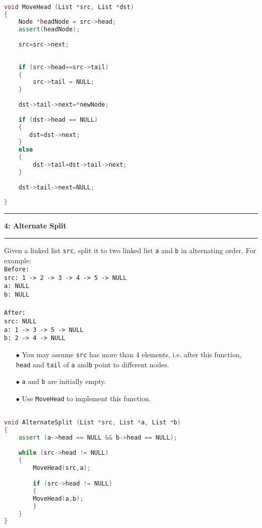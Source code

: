 \documentclass[10.5pt]{article}
\newcommand\question[2]{\vspace{.25in}\hrule\textbf{#1: #2}\vspace{.5em}\hrule\vspace{.10in}}
\begin{document}
\hrulefill
\begin{lstlisting}[language=C++]

void MoveHead (List *src, List *dst)
{
    Node *headNode = src->head;
    assert(headNode);
    
    src=src->next;
    
        
    if (src->head==src->tail)
    {
        src->tail = NULL;
    }
    
    dst->tail->next=*newNode;
    
    if (dst->head == NULL)
    {
       dst=dst->next;
    }
    else
    {
        dst->tail=dst->tail->next;
    }
    
    dst->tail->next=NULL;
    
}

\end{lstlisting}
\pagebreak

\question{4}{Alternate Split}
Given a linked list \texttt{src}, split it to two linked list  \texttt{a} and \texttt{b} in alternating order. For example:\\

\texttt{Before:}\\
\texttt{src: 1 -> 2 -> 3 -> 4 -> 5 -> NULL}\\
\texttt{a: NULL}\\
\texttt{b: NULL}\\
\\
\texttt{After:}\\
\texttt{src: NULL}\\
\texttt{a: 1 -> 3 -> 5 -> NULL}\\
\texttt{b: 2 -> 4 -> NULL}\\

\begin{enumerate}
	\item[$\bullet$] You may assume \texttt{src} has more than 4 elements, i.e. after this function, \texttt{head} and \texttt{tail} of \texttt{a} and\texttt{b} point to different nodes.
	\item[$\bullet$] \texttt{a} and \texttt{b} are initially empty.
	\item[$\bullet$] Use \texttt{MoveHead} to implement this function.
\end{enumerate}


\hrulefill
\begin{lstlisting}[language=C++]

void AlternateSplit (List *src, List *a, List *b)
{
    assert (a->head == NULL && b->head == NULL);
    
    while (src->head != NULL)
    {
        MoveHead(src,a);

     	if (src->head != NULL)
     	{
     	MoveHead(a,b);
     	}
    }
}

\end{lstlisting}
\pagebreak
\end{document}
